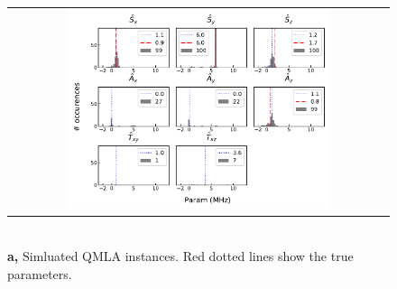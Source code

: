 
\begin{figure}
    \centering
    \begin{tabular}{@{}c@{}}
        \centering
        \includegraphics[width=0.7\textwidth]{experimental_study/figures/params_simulation.pdf}
    \end{tabular}
    \\ \small \textbf{a,} Simluated QMLA instances. Red dotted lines show the true parameters.
    

\end{figure}

